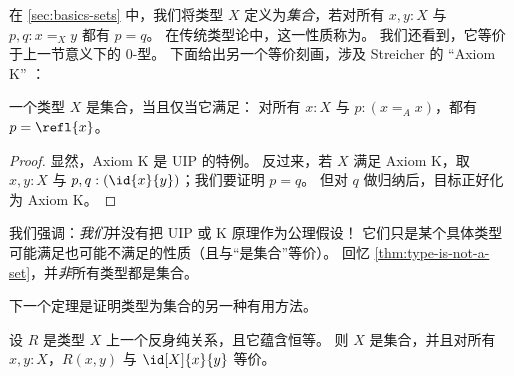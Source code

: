 %

在 \cref{sec:basics-sets} 中，我们将类型 $X$ 定义为\emph{集合}，若对所有 $x, y : X$ 与 $p, q : x =_X y$ 都有 $p = q$。
在传统类型论中，这一性质称为。
%
我们还看到，它等价于上一节意义下的 $0$-型。
下面给出另一个等价刻画，涉及 Streicher 的 ``Axiom K'' \cite{Streicher93}：

\begin{thm}\label{thm:h-set-uip-K}
 一个类型 $X$ 是集合，当且仅当它满足：
 对所有 $x : X$ 与 $p : (x =_A x)$，都有 $p = \refl{x}$。
\end{thm}

\begin{proof}
  显然，Axiom K 是 UIP 的特例。
  反过来，若 $X$ 满足 Axiom K，取 $x, y : X$ 与 $p, q : (\id{x}{y})$；我们要证明 $p=q$。
  但对 $q$ 做归纳后，目标正好化为 Axiom K。
\end{proof}

我们强调：\emph{我们}并没有把 UIP 或 K 原理作为公理假设！
它们只是某个具体类型可能满足也可能不满足的性质（且与“是集合”等价）。
回忆 \cref{thm:type-is-not-a-set}，并\emph{非}所有类型都是集合。

下一个定理是证明类型为集合的另一种有用方法。

\begin{thm}\label{thm:h-set-refrel-in-paths-sets}
  设 $R$ 是类型 $X$ 上一个反身纯关系，且它蕴含恒等。
  则 $X$ 是集合，并且对所有 $x,y:X$，$R(x,y)$ 与 $\id[X]{x}{y}$ 等价。
\end{thm}

